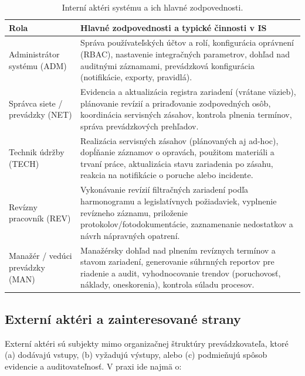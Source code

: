 \begin{table}[!htbp]
\centering
\small
\renewcommand{\arraystretch}{1.2}
\begin{tabular}{p{34mm} p{110mm}}
\toprule
\textbf{Rola} & \textbf{Hlavné zodpovednosti a typické činnosti v IS} \\
\midrule
Administrátor systému (ADM) & Správa používateľských účtov a rolí, konfigurácia oprávnení (RBAC), nastavenie integračných parametrov, dohľad nad auditnými záznamami, prevádzková konfigurácia (notifikácie, exporty, pravidlá). \\
\midrule
Správca siete / prevádzky (NET) & Evidencia a aktualizácia registra zariadení (vrátane väzieb), plánovanie revízií a priraďovanie zodpovedných osôb, koordinácia servisných zásahov, kontrola plnenia termínov, správa prevádzkových prehľadov. \\
\midrule
Technik údržby (TECH) & Realizácia servisných zásahov (plánovaných aj ad-hoc), dopĺňanie záznamov o opravách, použitom materiáli a trvaní práce, aktualizácia stavu zariadenia po zásahu, reakcia na notifikácie o poruche alebo incidente. \\
\midrule
Revízny pracovník (REV) & Vykonávanie revízií filtračných zariadení podľa harmonogramu a legislatívnych požiadaviek, vyplnenie revízneho záznamu, priloženie protokolov/fotodokumentácie, zaznamenanie nedostatkov a návrh nápravných opatrení. \\
\midrule
Manažér / vedúci prevádzky (MAN) & Manažérsky dohľad nad plnením revíznych termínov a stavom zariadení, generovanie súhrnných reportov pre riadenie a audit, vyhodnocovanie trendov (poruchovosť, náklady, oneskorenia), kontrola súladu procesov. \\
\bottomrule
\end{tabular}
\caption{Interní aktéri systému a ich hlavné zodpovednosti.}
\label{tab:internal-actors}
\end{table}

\subsection{Externí aktéri a zainteresované strany}

Externí aktéri sú subjekty mimo organizačnej štruktúry prevádzkovateľa, ktoré (a) dodávajú vstupy, (b) vyžadujú výstupy, alebo (c) podmieňujú spôsob evidencie a auditovateľnosť. V praxi ide najmä o:

